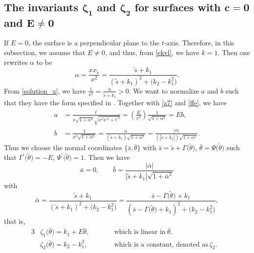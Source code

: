 \documentclass[pdftex]{sigma}
\numberwithin{equation}{section}
\begin{document}
\subsection[The invariants zeta\_1 and zeta\_2 for surfaces with c=0 and E neq 0]{The invariants $\boldsymbol{\zeta_{1}}$ and $\boldsymbol{\zeta_{2}}$ for surfaces with $\boldsymbol{c=0}$ and $\boldsymbol{E\neq 0}$}
 If $E=0$, the surface is a perpendicular plane to the $t$-axis. Therefore, in this subsection, we assume that $E\neq 0$, and thus, from \eqref{ekvl}, we have $k=1$.
Then one rewrites $\alpha$ to be
\begin{equation*}
\alpha=\frac{xx_{\tilde s}}{x^2}=\frac{\tilde s+k_1}{(\tilde s+k_1)^2+\bigl(k_2-k_{1}^{2}\bigr)}.
\end{equation*}
From \eqref{solution_x}, we have
$
\frac{1}{x^2}=\frac{\alpha}{\tilde{s}+k_1}>0$.
We want to normalize $a$ and $b$ such that they have the form specified in \cite[Theorem~1.3]{ChiuH/LiuH:2022}.
Together with \eqref{a7} and \eqref{ffe}, we have
\begin{align*}
a&=\frac{t^{\prime }}{x\sqrt{1+\alpha^2}\sqrt{x^{2}x^{\prime 2}+t^{\prime 2}}}
=\left(\frac{E}{x^{2}}\right)\frac{1}{\sqrt{1+\alpha^{2}}}=Eb, \\
b&=\frac{1}{x^2\sqrt{1+\alpha^2}}=\frac{\alpha}{(\tilde{s}+k_1)\sqrt{1+\alpha^2}}=\frac{|\alpha|}{(|\tilde{s}+k_1|)\sqrt{1+\alpha^2}}.
\end{align*}
Thus we choose the normal coordinates $\big\{ \bar{s},\bar{\theta}\big\}$ with
$
\bar{s}=\tilde{s}+\Gamma{\bigl(\tilde{\theta}\bigr)}$, $ \bar{\theta}=\Psi{\bigl(\tilde{\theta}\bigr)}
$
such that
$
\Gamma^{\prime }{\bigl(\tilde{\theta}\bigr)}=-E$, $ \Psi^{\prime }{\bigl(\tilde{\theta}\bigr)}=1$.
Then we have
\begin{equation*}
\bar{a}=0,\qquad \bar{b}=\frac{|\bar \alpha|}{|\tilde{s}+k_1|\sqrt{1+\bar
\alpha^2}}
\end{equation*}
with
\[
\bar \alpha=\frac{\tilde s+k_1}{(\tilde s+k_1)^2+\bigl(k_2-k_{1}^{2}\bigr)}=\frac{\bar{s}-\Gamma{\bigl(
\tilde{\theta}\bigr)}+k_1}{(\bar{s}-\Gamma{\bigl(\tilde{\theta}\bigr)}+k_1)^2+\bigl(k_2-k_{1}^{2}\bigr)},
\]
that is,
\begin{alignat*}{3}%
&\zeta_{1}\bigl(\bar \theta\bigr)=k_1+E\bar\theta,\qquad && \textrm{which is linear in} \ \bar{\theta},&\\
&\zeta_{2}\bigl(\bar \theta\bigr)=k_2-k_{1}^{2},\qquad && \textrm{which is a constant, denoted as} \ \zeta_{2}.&
\end{alignat*}
\end{document}
